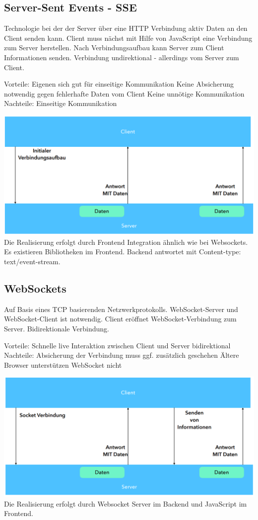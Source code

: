 \documentclass[12pt,a4paper]{article}
\begin{document}
\subsection{Server-Sent Events - SSE}
Technologie bei der der Server über eine HTTP Verbindung aktiv Daten an den Client
senden kann. Client muss nächst mit Hilfe von JavaScript eine Verbindung zum Server herstellen. Nach Verbindungsaufbau kann Server zum Client Informationen senden. Verbindung undirektional - allerdings vom Server zum Client. \\
\begin{outline}
	\1 Vorteile:
		\2 Eigenen sich gut für einseitige Kommunikation
		\2 Keine Absicherung notwendig gegen fehlerhafte Daten vom Client
		\2 Keine unnötige Kommunikation
	\1 Nachteile:
		\2 Einseitige Kommunikation
\end{outline}
\includegraphics[width=\textwidth]{Bilder/sse.PNG}
Die Realisierung erfolgt durch Frontend Integration ähnlich wie bei Websockets. Es existieren Bibliotheken im Frontend. Backend antwortet mit Content-type: text/event-stream.

\subsection{WebSockets}
Auf Basis eines TCP basierenden Netzwerkprotokolls. WebSocket-Server und WebSocket-Client ist notwendig. Client eröffnet WebSocket-Verbindung zum Server. Bidirektionale Verbindung.  \\
\begin{outline}
	\1 Vorteile:
		\2 Schnelle live Interaktion zwischen Client und Server bidirektional
	\1 Nachteile:
		\2 Absicherung der Verbindung muss ggf. zusätzlich geschehen
		\2 Ältere Browser unterstützen WebSocket nicht
\end{outline}
\includegraphics[width=\textwidth]{Bilder/websocket.PNG}
Die Realisierung erfolgt durch Websocket Server im Backend und JavaScript im Frontend.
\end{document}
